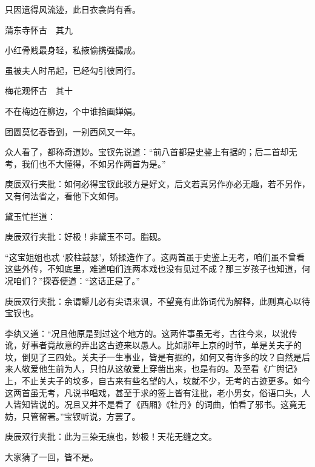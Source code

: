 \begin{poem}
\begin{pl}
        只因遗得风流迹，此日衣衾尚有香。
    \end{pl}
    \emptypl
    \begin{pl}

        蒲东寺怀古　其九
    \end{pl}
    \begin{pl}

        小红骨贱最身轻，私掖偷携强撮成。
    \end{pl}
    \begin{pl}

        虽被夫人时吊起，已经勾引彼同行。
    \end{pl}
    \emptypl
    \begin{pl}

        梅花观怀古　其十
    \end{pl}
    \begin{pl}

        不在梅边在柳边，个中谁拾画婵娟。
    \end{pl}
    \begin{pl}

        团圆莫忆春香到，一别西风又一年。
    \end{pl}
\end{poem}


\begin{parag}
    众人看了，都称奇道妙。宝钗先说道：“前八首都是史鉴上有据的；后二首却无考，我们也不大懂得，不如另作两首为是。”\begin{note}庚辰双行夹批：如何必得宝钗此驳方是好文，后文若真另作亦必无趣，若不另作，又有何法省之，看他下文如何。\end{note}黛玉忙拦道：\begin{note}庚辰双行夹批：好极！非黛玉不可。脂砚。\end{note}“这宝姐姐也忒 ‘胶柱鼓瑟’，矫揉造作了。这两首虽于史鉴上无考，咱们虽不曾看这些外传，不知底里，难道咱们连两本戏也没有见过不成？那三岁孩子也知道，何况咱们？”探春便道：“这话正是了。”\begin{note}庚辰双行夹批：余谓颦儿必有尖语来讽，不望竟有此饰词代为解释，此则真心以待宝钗也。\end{note}李纨又道：“况且他原是到过这个地方的。这两件事虽无考，古往今来，以讹传讹，好事者竟故意的弄出这古迹来以愚人。比如那年上京的时节，单是关夫子的坟，倒见了三四处。关夫子一生事业，皆是有据的，如何又有许多的坟？自然是后来人敬爱他生前为人，只怕从这敬爱上穿凿出来，也是有的。及至看《广舆记》上，不止关夫子的坟多，自古来有些名望的人，坟就不少，无考的古迹更多。如今这两首虽无考，凡说书唱戏，甚至于求的签上皆有注批，老小男女，俗语口头，人人皆知皆说的。况且又并不是看了《西厢》《牡丹》的词曲，怕看了邪书。这竟无妨，只管留著。”宝钗听说，方罢了。\begin{note}庚辰双行夹批：此为三染无痕也，妙极！天花无缝之文。\end{note}大家猜了一回，皆不是。
\end{parag}



